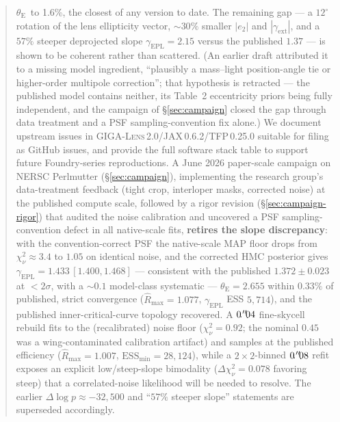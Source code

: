 \documentclass[11pt,letterpaper]{article}
\newcommand{\thetaE}{\ensuremath{\theta_{\mathrm{E}}}}
\newcommand{\gammaEPL}{\ensuremath{\gamma_{\mathrm{EPL}}}}
\newcommand{\gext}{\ensuremath{\gamma_{\mathrm{ext}}}}
\newcommand{\etwo}{\ensuremath{e_{2}}}
\newcommand{\gigalens}{\textsc{GIGA-Lens}}
\begin{document}
\begin{abstract}
\thetaE\ to 1.6\%, the closest of any version to date. The remaining
gap --- a $12^{\circ}$ rotation of the lens ellipticity vector,
$\sim30\%$ smaller $|\etwo|$ and $|\gext|$, and a $57\%$ steeper
deprojected slope $\gammaEPL=2.15$ versus the published $1.37$ --- is
shown to be coherent rather than scattered. (An earlier draft attributed
it to a missing model ingredient, ``plausibly a mass--light
position-angle tie or higher-order multipole correction''; that
hypothesis is retracted --- the published model contains neither, its
Table~2 eccentricity priors being fully independent, and the campaign
of \S\ref{sec:campaign} closed the gap through data treatment and a PSF
sampling-convention fix alone.)
We document upstream issues in \gigalens\,2.0/JAX\,0.6.2/TFP\,0.25.0
suitable for filing as GitHub issues, and provide the full software
stack table to support future Foundry-series reproductions.
A June 2026 paper-scale campaign on NERSC Perlmutter
(\S\ref{sec:campaign}), implementing the research group's data-treatment
feedback (tight crop, interloper masks, corrected noise) at the
published compute scale, followed by a rigor revision
(\S\ref{sec:campaign-rigor}) that audited the noise calibration and
uncovered a PSF sampling-convention defect in all native-scale fits,
{\bf retires the slope discrepancy}: with the convention-correct PSF
the native-scale MAP floor drops from $\chi^{2}_{\nu}\approx3.4$ to
$1.05$ on identical noise, and the corrected HMC posterior gives
$\gammaEPL=1.433\,[1.400,1.468]$ --- consistent with the published
$1.372\pm0.023$ at $<2\sigma$, with a $\sim$$0.1$ model-class
systematic --- $\thetaE=2.655$ within $0.33\%$ of published, strict
convergence ($\hat R_{\max}=1.077$, $\gammaEPL$ ESS $5{,}714$), and the
published inner-critical-curve topology recovered. A $0\farcs04$
fine-skycell rebuild fits to the (recalibrated) noise floor
($\chi^{2}_{\nu}=0.92$; the nominal $0.45$ was a wing-contaminated
calibration artifact) and samples at the published efficiency
($\hat R_{\max}=1.007$, $\mathrm{ESS}_{\min}=28{,}124$), while a
$2\times2$-binned $0\farcs08$ refit exposes an explicit
low/steep-slope bimodality ($\Delta\chi^{2}_{\nu}=0.078$ favoring
steep) that a correlated-noise likelihood will be needed to resolve.
The earlier $\Delta\log p\approx-32{,}500$ and ``$57\%$ steeper
slope'' statements are superseded accordingly.
\end{abstract}

\tableofcontents

\bigskip

\end{document}
